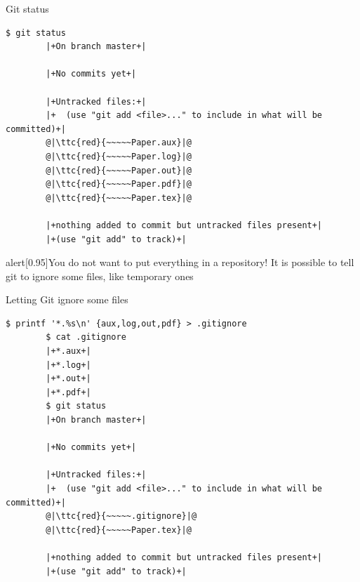 \documentclass[usenames,svgnames,14pt]{beamer}
\newcommand{\ttc}[2]{\texttt{\textcolor{#1}{#2}}}
\begin{document}
\begin{frame}[fragile]{Git status}
    \begin{lstlisting}[style=MyBash]
        $ git status 
        |+On branch master+|

        |+No commits yet+|

        |+Untracked files:+|
        |+  (use "git add <file>..." to include in what will be committed)+|
        @|\ttc{red}{~~~~~Paper.aux}|@
        @|\ttc{red}{~~~~~Paper.log}|@
        @|\ttc{red}{~~~~~Paper.out}|@
        @|\ttc{red}{~~~~~Paper.pdf}|@
        @|\ttc{red}{~~~~~Paper.tex}|@

        |+nothing added to commit but untracked files present+|
        |+(use "git add" to track)+|
    \end{lstlisting}
    \begin{varblock}{alert}[0.95\textwidth]{You do not want to put everything in a repository!}
        It is possible to tell git to ignore some files, like temporary ones
    \end{varblock}
\end{frame}
\begin{frame}[fragile]{Letting Git ignore some files}
    \begin{lstlisting}[style=MyBash]
        $ printf '*.%s\n' {aux,log,out,pdf} > .gitignore
        $ cat .gitignore
        |+*.aux+|
        |+*.log+|
        |+*.out+|
        |+*.pdf+|
        $ git status
        |+On branch master+|

        |+No commits yet+|

        |+Untracked files:+|
        |+  (use "git add <file>..." to include in what will be committed)+|
        @|\ttc{red}{~~~~~.gitignore}|@
        @|\ttc{red}{~~~~~Paper.tex}|@

        |+nothing added to commit but untracked files present+|
        |+(use "git add" to track)+|
    \end{lstlisting}
    \begin{center}
        \qquad
    \end{center}
\end{frame}
\end{document}
